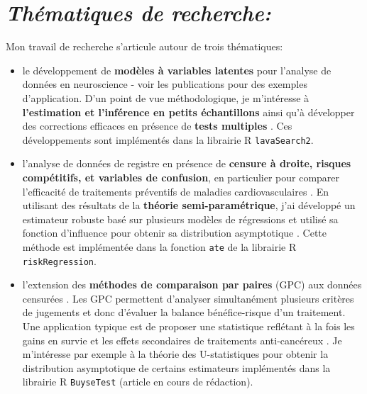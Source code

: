 \documentclass[12pt]{article}
\begin{document}
\section*{\emph{Thématiques de recherche:}}
\label{sec:orgc50da6a}
{ \justify
Mon travail de recherche s'articule autour de trois thématiques:
\begin{itemize}
\item le développement de \textbf{modèles à variables latentes} pour l'analyse de
données en neuroscience - voir les publications
\cite{ebert2019molecular,stenbaek2017brain,fisher2017bdnf} pour des
exemples d'application. D'un point de vue méthodologique, je
m'intéresse à \textbf{l'estimation et l'inférence en petits échantillons}
\citep{ozenne2020small} ainsi qu'à développer des corrections
efficaces en présence de \textbf{tests multiples}
\citep{ozenne20XXcontroling}. Ces développements sont implémentés dans
la librairie R \texttt{lavaSearch2}.
\end{itemize}

\bigskip

\begin{itemize}
\item l'analyse de données de registre en présence de \textbf{censure à droite,
risques compétitifs, et variables de confusion}, en particulier pour
comparer l'efficacité de traitements préventifs de maladies
cardiovasculaires
\citep{staerk2016ischaemic,staerk2017resumption,staerk2018standard}. En
utilisant des résultats de la \textbf{théorie semi-paramétrique}, j'ai
développé un estimateur robuste basé sur plusieurs modèles de
régressions et utilisé sa fonction d'influence pour obtenir sa
distribution asymptotique \citep{ozenne2020estimation}. Cette méthode
est implémentée dans la fonction \texttt{ate} de la librairie R
\texttt{riskRegression}.
\end{itemize}

\bigskip

\begin{itemize}
\item l'extension des \textbf{méthodes de comparaison par paires} (GPC) aux
données censurées \citep{peron2016extension}. Les GPC permettent
d'analyser simultanément plusieurs critères de jugements et donc
d'évaluer la balance bénéfice-risque d'un traitement. Une
application typique est de proposer une statistique reflétant à la
fois les gains en survie et les effets secondaires de traitements
anti-cancéreux \citep{peron2016net,peron2016assessment}. Je
m'intéresse par exemple à la théorie des U-statistiques pour obtenir
la distribution asymptotique de certains estimateurs implémentés
dans la librairie R \texttt{BuyseTest} (article en cours de rédaction).
\end{itemize}
}
\end{document}
